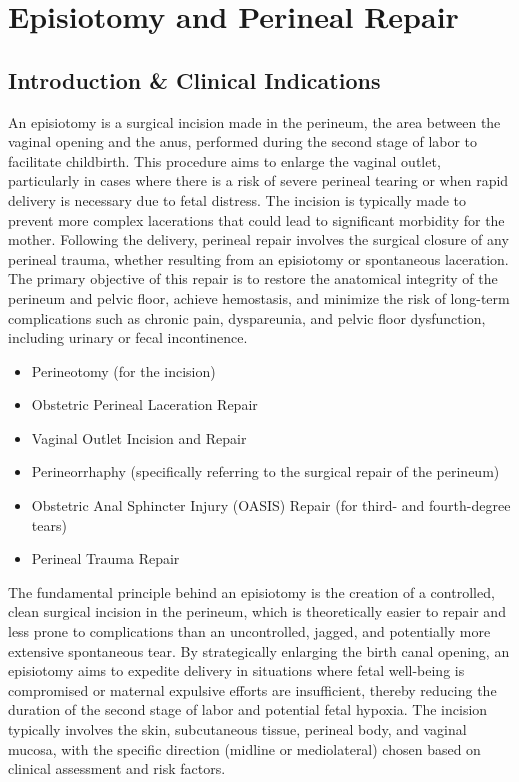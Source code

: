 \chapter{Episiotomy and Perineal Repair}

\section*{Introduction \& Clinical Indications}
An episiotomy is a surgical incision made in the perineum, the area between the vaginal opening and the anus, performed during the second stage of labor to facilitate childbirth. This procedure aims to enlarge the vaginal outlet, particularly in cases where there is a risk of severe perineal tearing or when rapid delivery is necessary due to fetal distress. The incision is typically made to prevent more complex lacerations that could lead to significant morbidity for the mother. Following the delivery, perineal repair involves the surgical closure of any perineal trauma, whether resulting from an episiotomy or spontaneous laceration. The primary objective of this repair is to restore the anatomical integrity of the perineum and pelvic floor, achieve hemostasis, and minimize the risk of long-term complications such as chronic pain, dyspareunia, and pelvic floor dysfunction, including urinary or fecal incontinence.

\begin{itemize}
  \item Perineotomy (for the incision)
  \item Obstetric Perineal Laceration Repair
  \item Vaginal Outlet Incision and Repair
  \item Perineorrhaphy (specifically referring to the surgical repair of the perineum)
  \item Obstetric Anal Sphincter Injury (OASIS) Repair (for third- and fourth-degree tears)
  \item Perineal Trauma Repair
\end{itemize}

The fundamental principle behind an episiotomy is the creation of a controlled, clean surgical incision in the perineum, which is theoretically easier to repair and less prone to complications than an uncontrolled, jagged, and potentially more extensive spontaneous tear. By strategically enlarging the birth canal opening, an episiotomy aims to expedite delivery in situations where fetal well-being is compromised or maternal expulsive efforts are insufficient, thereby reducing the duration of the second stage of labor and potential fetal hypoxia. The incision typically involves the skin, subcutaneous tissue, perineal body, and vaginal mucosa, with the specific direction (midline or mediolateral) chosen based on clinical assessment and risk factors.

